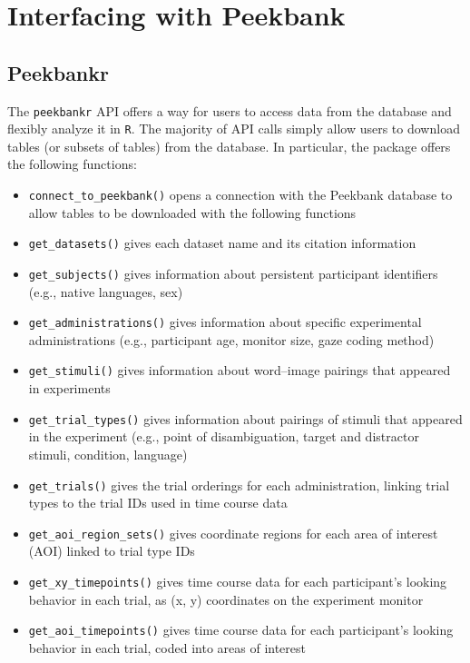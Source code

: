 \documentclass[
  english,
  man,floatsintext]{apa6}
\providecommand{\tightlist}{%
  \setlength{\itemsep}{0pt}\setlength{\parskip}{0pt}}
\begin{document}
\hypertarget{interfacing-with-peekbank}{%
\section{Interfacing with Peekbank}\label{interfacing-with-peekbank}}

\hypertarget{peekbankr}{%
\subsection{Peekbankr}\label{peekbankr}}

The \texttt{peekbankr} API offers a way for users to access data from the database and flexibly analyze it in \texttt{R}. The majority of API calls simply allow users to download tables (or subsets of tables) from the database. In particular, the package offers the following functions:

\begin{itemize}
\tightlist
\item
  \texttt{connect\_to\_peekbank()} opens a connection with the Peekbank database to allow tables to be downloaded with the following functions
\item
  \texttt{get\_datasets()} gives each dataset name and its citation information
\item
  \texttt{get\_subjects()} gives information about persistent participant identifiers (e.g., native languages, sex)
\item
  \texttt{get\_administrations()} gives information about specific experimental administrations (e.g., participant age, monitor size, gaze coding method)
\item
  \texttt{get\_stimuli()} gives information about word--image pairings that appeared in experiments\\
\item
  \texttt{get\_trial\_types()} gives information about pairings of stimuli that appeared in the experiment (e.g., point of disambiguation, target and distractor stimuli, condition, language)
\item
  \texttt{get\_trials()} gives the trial orderings for each administration, linking trial types to the trial IDs used in time course data
\item
  \texttt{get\_aoi\_region\_sets()} gives coordinate regions for each area of interest (AOI) linked to trial type IDs
\item
  \texttt{get\_xy\_timepoints()} gives time course data for each participant's looking behavior in each trial, as (x, y) coordinates on the experiment monitor
\item
  \texttt{get\_aoi\_timepoints()} gives time course data for each participant's looking behavior in each trial, coded into areas of interest
\end{itemize}
\end{document}
